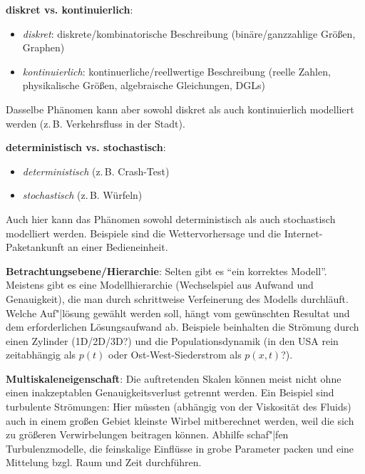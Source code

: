 \textbf{diskret vs. kontinuierlich}:
\begin{itemize}
    \item
    \emph{diskret}:
    diskrete/kombinatorische Beschreibung
    (binäre/ganzzahlige Größen, Graphen)

    \item
    \emph{kontinuierlich}:
    kontinuerliche/reellwertige Beschreibung
    (reelle Zahlen, physikalische Größen, algebraische Gleichungen, DGLs)
\end{itemize}
Dasselbe Phänomen kann aber sowohl diskret als auch kontinuierlich modelliert werden
(z.\,B. Verkehrsfluss in der Stadt).

\linie

\textbf{deterministisch vs. stochastisch}:
\begin{itemize}
    \item
    \emph{deterministisch}
    (z.\,B. Crash-Test)

    \item
    \emph{stochastisch}
    (z.\,B. Würfeln)
\end{itemize}
Auch hier kann das Phänomen sowohl deterministisch als auch stochastisch modelliert werden.
Beispiele sind die Wettervorhersage und die Internet-Paketankunft an einer Bedieneinheit.

\linie

\textbf{Betrachtungsebene/Hierarchie}:
Selten gibt es "`ein korrektes Modell"'.
Meistens gibt es eine Modellhierarchie (Wechselspiel aus Aufwand und Genauigkeit),
die man durch schrittweise Verfeinerung des Modells durchläuft.
Welche Auf"|lösung gewählt werden soll, hängt vom gewünschten Resultat und dem erforderlichen
Lösungsaufwand ab.
Beispiele beinhalten die Strömung durch einen Zylinder (1D/2D/3D?) und
die Populationsdynamik
(in den USA rein zeitabhängig als $p(t)$ oder Ost-West-Siederstrom als $p(x, t)$?).

\textbf{Multiskaleneigenschaft}:
Die auftretenden Skalen können meist nicht ohne einen inakzeptablen Genauigkeitsverlust getrennt
werden.
Ein Beispiel sind turbulente Strömungen:
Hier müssten (abhängig von der Viskosität des Fluids) auch in einem großen Gebiet kleinste Wirbel
mitberechnet werden, weil die sich zu größeren Verwirbelungen beitragen können.
Abhilfe schaf"|fen Turbulenzmodelle, die feinskalige Einflüsse in grobe Parameter packen und
eine Mittelung bzgl. Raum und Zeit durchführen.

\pagebreak
